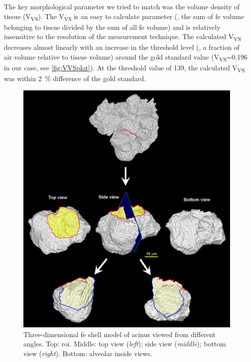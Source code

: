 The key morphological parameter we tried to match was the volume density of tissue (V\textsubscript{VS}). The V\textsubscript{VS} is an easy to calculate parameter (\ie, the sum of \ac{fe} volume belonging to tissue divided by the sum of all \ac{fe} volume) and is relatively insensitive to the resolution of the measurement technique. The calculated V\textsubscript{VS} decreases almost linearly with an increase in the threshold level (\ie, a fraction of air volume relative to tissue volume) around the gold standard value (V\textsubscript{VS}=0.196 in our case, see \autoref{fig:VVSplot}). At the threshold value of 139, the calculated V\textsubscript{VS} was within \SI{2}{\percent} difference of the gold standard.

\renewcommand{\imsize}{\linewidth}
\begin{figure}
	\centering
	\includegraphics[width=\imsize]{img/Tsuda2008/Tsuda-10}
	\caption[Three-dimensional FE shell model of a partial acinus]{Three-dimensional \ac{fe} shell model of acinus viewed from different angles. Top: \ac{roi}. Middle: top view (\textit{left}); side view (\textit{middle}); bottom view (\textit{right}). Bottom: alveolar inside views.}
	\label{fig:alveolus}
\end{figure}


